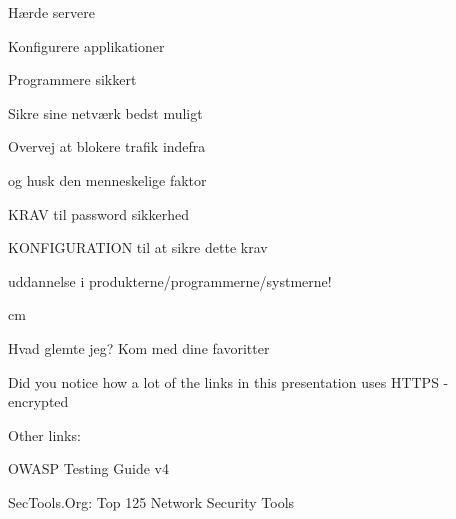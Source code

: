 \documentclass[20pt,landscape,a4paper,footrule]{foils}
\begin{document}
\begin{list1}
\item Hærde servere
\item Konfigurere applikationer
\item Programmere sikkert
\item Sikre sine netværk bedst muligt
\item Overvej at blokere trafik indefra
\item og husk den menneskelige faktor
\item KRAV til password sikkerhed
\item KONFIGURATION til at sikre dette krav
\item uddannelse i produkterne/programmerne/systmerne!
\end{list1}






 cm

\centerline{\Large Hvad glemte jeg? Kom med dine favoritter \smiley}

Did you notice how a lot of the links in this presentation uses HTTPS - encrypted

Other links:

OWASP Testing Guide v4\\

SecTools.Org: Top 125 Network Security Tools\\



\myquestionspage
\end{document}
